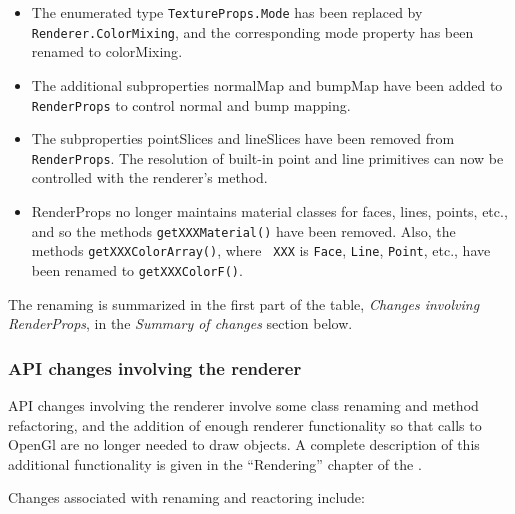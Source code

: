 \documentclass{article}
\begin{document}
\begin{itemize}
\item The enumerated type {\tt TextureProps.Mode} has been replaced by
{\tt Renderer.ColorMixing}, and the corresponding {\sf mode} property
has been renamed to {\sf colorMixing}.

\item The additional subproperties {\sf normalMap} and {\sf bumpMap}
have been added to {\tt RenderProps} to control normal and bump
mapping.

\item The subproperties {\sf pointSlices} and {\sf lineSlices} have been
removed from {\tt RenderProps}. The resolution of built-in point and
line primitives can now be controlled with the renderer's
 method.

\item RenderProps no longer maintains material classes for faces,
lines, points, etc., and so the methods {\tt getXXXMaterial()} have
been removed. Also, the methods {\tt getXXXColorArray()}, where {\tt
XXX} is {\tt Face}, {\tt Line}, {\tt Point}, etc., have been renamed to
{\tt getXXXColorF()}.

\end{itemize}

The renaming is summarized in the first part of the table, {\it Changes
involving RenderProps}, in the {\it Summary of changes} section below.

\subsubsection*{API changes involving the renderer}

API changes involving the renderer involve some class renaming and
method refactoring, and the addition of enough renderer functionality
so that calls to OpenGl are no longer needed to draw
objects. A complete description of this additional functionality is
given in the ``Rendering'' chapter of the
.

Changes associated with renaming and reactoring include:
\end{document}
